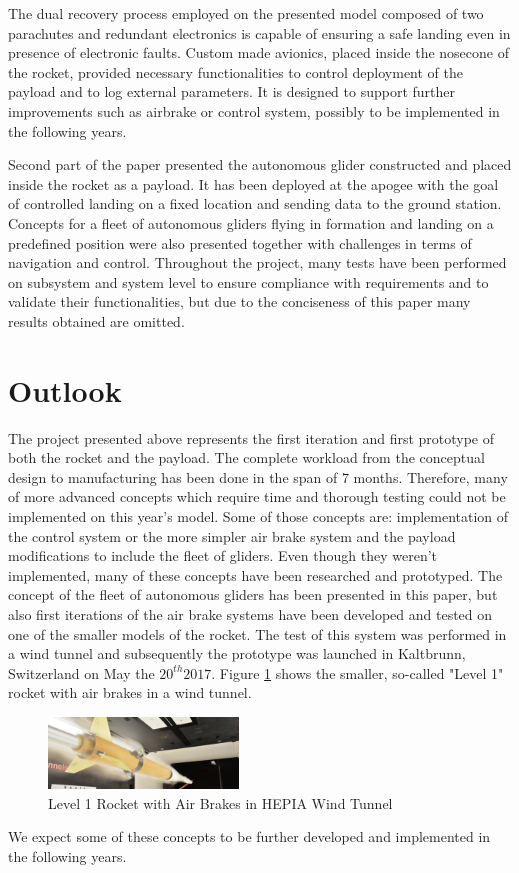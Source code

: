 \documentclass[]{iac}
\begin{document}
The dual recovery process employed on the presented model composed of two parachutes and redundant electronics is capable of ensuring a safe landing even in presence of electronic faults. Custom made avionics, placed inside the nosecone of the rocket, provided necessary functionalities to control deployment of the payload and to log external parameters. It is designed to support further improvements such as airbrake or control system, possibly to be implemented in the following years.

Second part of the paper presented the autonomous glider constructed and placed inside the rocket as a payload. It has been deployed at the apogee with the goal of controlled landing on a fixed location and sending data to the ground station. Concepts for a fleet of autonomous gliders flying in formation and landing on a predefined position were also presented together with challenges in terms of navigation and control. Throughout the project, many tests have been performed on subsystem and system level to ensure compliance with requirements and to validate their functionalities, but due to the conciseness of this paper many results obtained are omitted.

\section{Outlook}
The project presented above represents the first iteration and first prototype of both the rocket and the payload. The complete workload from the conceptual design to manufacturing has been done in the span of 7 months. Therefore, many of more advanced concepts which require time and thorough testing could not be implemented on this year's model. Some of those concepts are: implementation of the control system or the more simpler air brake system and the payload modifications to include the fleet of gliders. Even though they weren't implemented, many of these concepts have been researched and prototyped. The concept of the fleet of autonomous gliders has been presented in this paper, but also first iterations of the air brake systems have been developed and tested on one of the smaller models of the rocket. The test of this system was performed in a wind tunnel and subsequently the prototype was launched in Kaltbrunn, Switzerland on May the $20^{th} 2017$. Figure \ref{f:level1_airbrake} shows the smaller, so-called "Level 1" rocket with air brakes in a wind tunnel. 

  \begin{figure}[h!]
 	\centering
        \includegraphics[width=0.45\textwidth]{img/level1.png}
        \caption{Level 1 Rocket with Air Brakes in HEPIA Wind Tunnel}
        \label{f:level1_airbrake}
 \end{figure}

We expect some of these concepts to be further developed and implemented in the following years.



\printglossary[nonumberlist] 



\end{document}
